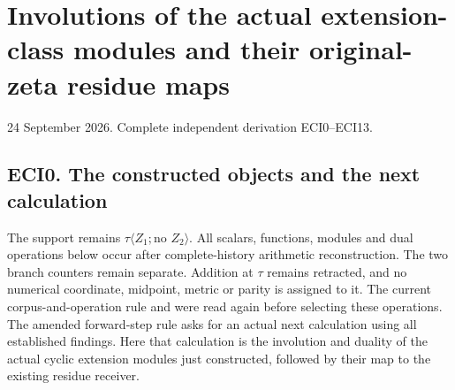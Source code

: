 \chapter{Involutions of the actual extension-class modules and their
original-zeta residue
maps}\label{involutions-of-the-actual-extension-class-modules-and-their-original-zeta-residue-maps}

24 September 2026. Complete independent derivation ECI0--ECI13.

\section{ECI0. The constructed objects and the next
calculation}\label{eci0.-the-constructed-objects-and-the-next-calculation}

The support remains \(\tau\langle Z_1;\text{no }Z_2\rangle\). All
scalars, functions, modules and dual operations below occur after
complete-history arithmetic reconstruction. The two branch counters
remain separate. Addition at \(\tau\) remains retracted, and no
numerical coordinate, midpoint, metric or parity is assigned to it. The
current corpus-and-operation rule and
 were read again before
selecting these operations. The amended forward-step rule asks for an
actual next calculation using all established findings. Here that
calculation is the involution and duality of the actual cyclic extension
modules just constructed, followed by their map to the existing residue
receiver.

